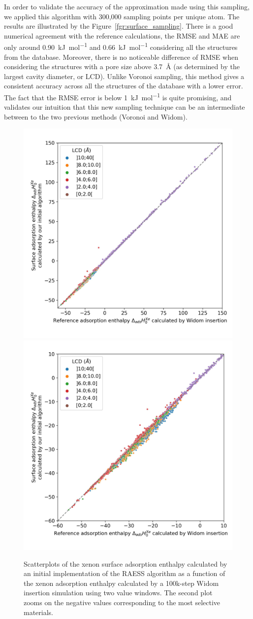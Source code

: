 \documentclass[main]{subfiles}
\begin{document}
In order to validate the accuracy of the approximation made using this sampling, we applied this algorithm with 300,000 sampling points per unique atom. The results are illustrated by the Figure~\ref{fgr:surface_sampling}. There is a good numerical agreement with the reference calculations, {the RMSE and MAE are only around \SI{0.90}{\kilo\joule\per\mole} and \SI{0.66}{\kilo\joule\per\mole}} considering all the structures from the database. Moreover, there is no noticeable difference of RMSE when considering the structures with a pore size above \SI{3.7}{\angstrom} (as determined by the largest cavity diameter, or LCD). Unlike Voronoi sampling, this method gives a consistent accuracy across all the structures of the database with a lower error. The fact that the {RMSE} error is below \SI{1}{\kilo\joule\per\mole} is quite promising, and validates our intuition that this new sampling technique can be an intermediate between to the two previous methods (Voronoi and Widom).

\begin{figure}[ht]
  \centering
  \includegraphics[width=0.48\linewidth]{figures/3-fastsim/H_Xe_widom_vs_H_Xe_surface_spiral_overview.jpg}
  \includegraphics[width=0.48\linewidth]{figures/3-fastsim/H_Xe_widom_vs_H_Xe_surface_spiral_zoom.jpg}
    \caption{Scatterplots of the xenon surface adsorption enthalpy calculated by an initial implementation of the RAESS algorithm as a function of the xenon adsorption enthalpy calculated by a 100k-step Widom insertion simulation using two value windows. The second plot zooms on the negative values corresponding to the most selective materials.}\label{fgr:surface_sampling_init}
\end{figure}
\end{document}
